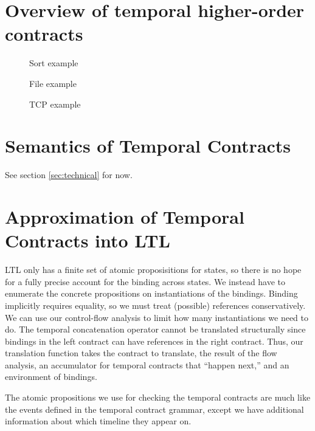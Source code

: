 \documentclass[preprint,onecolumn,9pt]{sigplanconf} %
\begin{document}
\section{Overview of temporal higher-order contracts}

\begin{figure}
 \caption{Sort example}
\end{figure}

\begin{figure}
 \caption{File example}
\end{figure}

\begin{figure}
 \caption{TCP example}
\end{figure}

\section{Semantics of Temporal Contracts}

See section \ref{sec:technical} for now.

\section{Approximation of Temporal Contracts into LTL}

LTL only has a finite set of atomic proposisitions for states, so there is no hope for a fully precise account for the binding across states.
%
We instead have to enumerate the concrete propositions on instantiations of the bindings.
%
Binding implicitly requires equality, so we must treat (possible) references conservatively.
%
We can use our control-flow analysis to limit how many instantiations we need to do.
%
The temporal concatenation operator cannot be translated structurally since bindings in the left contract can have references in the right contract.
%
Thus, our translation function takes the contract to translate, the result of the flow analysis, an accumulator for temporal contracts that ``happen next,'' and an environment of bindings.

The atomic propositions we use for checking the temporal contracts are much like the events defined in the temporal contract grammar, except we have additional information about which timeline they appear on.
\end{document}
